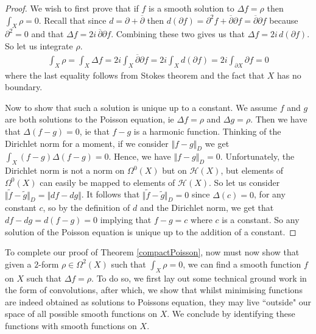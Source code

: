 \documentclass[11pt]{report}
\theoremstyle{definition}
\begin{document}
\begin{proof}
  We wish to first prove that if $f$ is a smooth solution to $\Delta f = \rho$ then $\int_X \rho = 0$. Recall that since $d = \partial + \overline{\partial}$ then $d(\partial f) = \partial^2 f + \overline{\partial}\partial f = \overline{\partial}\partial f$ because $\partial^2 = 0$ and that $\Delta f = 2i \, \overline{\partial}\partial f$. Combining these two gives us that $\Delta f =2i\,d(\partial f)$. So let us integrate $\rho$.
  \begin{align*}
    \int_X \rho = \int_X \Delta f = 2i \int_X \overline{\partial}\partial f = 2i \int_X d(\partial f) = 2i\int_{\partial X}\partial f = 0
  \end{align*}
  where the last equality follows from Stokes theorem and the fact that $X$ has no boundary. 

  Now to show that such a solution is unique up to a constant. We assume $f$ and $g$ are both solutions to the Poisson equation, ie $\Delta f = \rho$ and $\Delta g = \rho$. Then we have that $\Delta (f - g) = 0$, ie that $f-g$ is a harmonic function. Thinking of the Dirichlet norm for a moment, if we consider $\Vert f-g\Vert _D$ we get $\int_X (f-g)\Delta(f-g) = 0$. Hence, we have $\Vert f-g\Vert _D = 0$. Unfortunately, the Dirichlet norm is not a norm on $\Omega^0(X)$ but on $\mathcal{H}(X)$, but elements of $\Omega^0(X)$ can easily be mapped to elements of $\mathcal{H}(X)$. So let us consider $\Vert \tilde{f}-\tilde{g}\Vert _D = \Vert df - dg\Vert $. It follows that $\Vert \tilde{f}- \tilde{g}\Vert _D = 0$ since $\Delta(c) = 0$, for any constant $c$, so by the definition of $d$ and the Dirichlet norm, we get that $ df - dg = d(f-g) = 0$ implying that $f - g = c$ where $c$ is a constant. So any solution of the Poisson equation is unique up to the addition of a constant.
\end{proof} 

To complete our proof of Theorem \ref{compactPoisson}, now must now show that given a $2$-form $\rho \in \Omega^2(X)$ such that $\int_X \rho = 0$, we can find a smooth function $f$ on $X$ such that $\Delta f = \rho$. To do so, we first lay out some technical ground work in the form of convolutions, after which, we show that whilst minimising functions are indeed obtained as solutions to Poissons equation, they may live ``outside" our space of all possible smooth functions on $X$. We conclude by identifying these functions with smooth functions on $X$.
\end{document}
